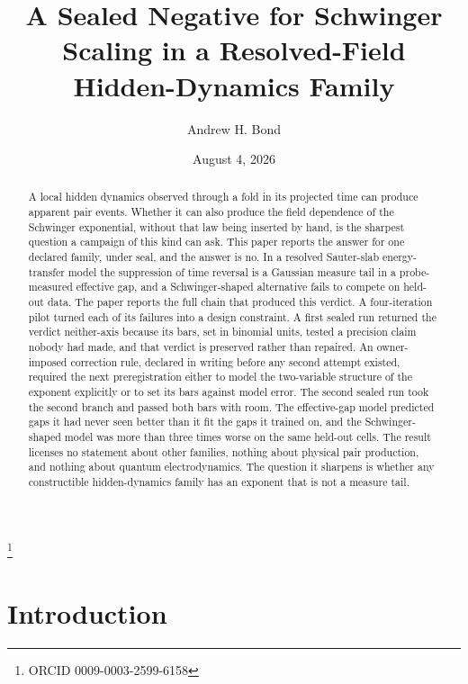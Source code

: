 \documentclass[aps,prd,reprint,nofootinbib,longbibliography]{revtex4-2}
\begin{document}
\title{A Sealed Negative for Schwinger Scaling in a Resolved-Field
Hidden-Dynamics Family}

\author{Andrew H. Bond}
\thanks{ORCID 0009-0003-2599-6158}
\date{August 4, 2026}

\begin{abstract}
A local hidden dynamics observed through a fold in its projected time can
produce apparent pair events.  Whether it can also produce the field
dependence of the Schwinger exponential, without that law being inserted
by hand, is the sharpest question a campaign of this kind can ask.  This
paper reports the answer for one declared family, under seal, and the
answer is no.  In a resolved Sauter-slab energy-transfer model the
suppression of time reversal is a Gaussian measure tail in a
probe-measured effective gap, and a Schwinger-shaped alternative fails to
compete on held-out data.  The paper reports the full chain that produced
this verdict.  A four-iteration pilot turned each of its failures into a
design constraint.  A first sealed run returned the verdict neither-axis
because its bars, set in binomial units, tested a precision claim nobody
had made, and that verdict is preserved rather than repaired.  An
owner-imposed correction rule, declared in writing before any second
attempt existed, required the next preregistration either to model the
two-variable structure of the exponent explicitly or to set its bars
against model error.  The second sealed run took the second branch and
passed both bars with room.  The effective-gap model predicted gaps it
had never seen better than it fit the gaps it trained on, and the
Schwinger-shaped model was more than three times worse on the same
held-out cells.  The result licenses no statement about other families,
nothing about physical pair production, and nothing about quantum
electrodynamics.  The question it sharpens is whether any constructible
hidden-dynamics family has an exponent that is not a measure tail.
\end{abstract}

\maketitle

\section{Introduction}
\label{sec:intro}
\end{document}
